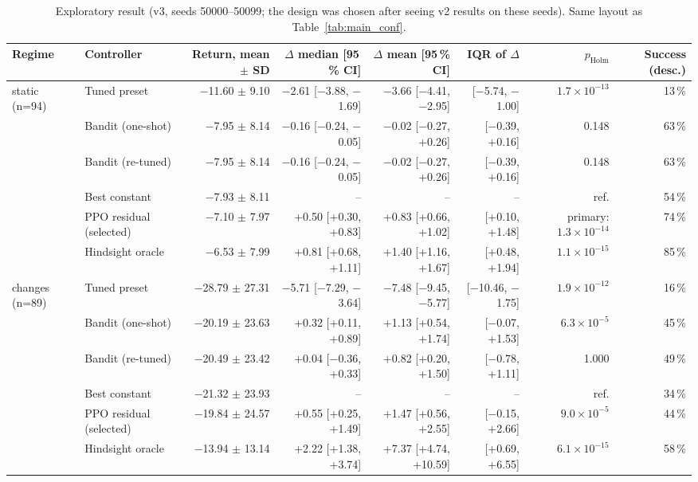 \begin{table}[t]
\centering
\small
\caption{Exploratory result (v3, seeds 50000--50099; the design was chosen after seeing v2 results on these seeds). Same layout as Table~\ref{tab:main_conf}.}
\label{tab:main_expl}
\begin{tabular}{llrrrrrr}
\toprule
Regime & Controller & Return, mean $\pm$ SD & $\Delta$ median [95\,\% CI] & $\Delta$ mean [95\,\% CI] & IQR of $\Delta$ & $p_{\mathrm{Holm}}$ & Success (desc.)\\
\midrule
static (n=94) & Tuned preset & $-$11.60 $\pm$ 9.10 & $-$2.61 [$-$3.88, $-$1.69] & $-$3.66 [$-$4.41, $-$2.95] & [$-$5.74, $-$1.00] & $1.7{\times}10^{-13}$ & 13\,\%\\
 & Bandit (one-shot) & $-$7.95 $\pm$ 8.14 & $-$0.16 [$-$0.24, $-$0.05] & $-$0.02 [$-$0.27, +0.26] & [$-$0.39, +0.16] & 0.148 & 63\,\%\\
 & Bandit (re-tuned) & $-$7.95 $\pm$ 8.14 & $-$0.16 [$-$0.24, $-$0.05] & $-$0.02 [$-$0.27, +0.26] & [$-$0.39, +0.16] & 0.148 & 63\,\%\\
 & Best constant & $-$7.93 $\pm$ 8.11 & -- & -- & -- & ref. & 54\,\%\\
 & PPO residual (selected) & $-$7.10 $\pm$ 7.97 & +0.50 [+0.30, +0.83] & +0.83 [+0.66, +1.02] & [+0.10, +1.48] & primary: $1.3{\times}10^{-14}$ & 74\,\%\\
 & Hindsight oracle & $-$6.53 $\pm$ 7.99 & +0.81 [+0.68, +1.11] & +1.40 [+1.16, +1.67] & [+0.48, +1.94] & $1.1{\times}10^{-15}$ & 85\,\%\\
\midrule
changes (n=89) & Tuned preset & $-$28.79 $\pm$ 27.31 & $-$5.71 [$-$7.29, $-$3.64] & $-$7.48 [$-$9.45, $-$5.77] & [$-$10.46, $-$1.75] & $1.9{\times}10^{-12}$ & 16\,\%\\
 & Bandit (one-shot) & $-$20.19 $\pm$ 23.63 & +0.32 [+0.11, +0.89] & +1.13 [+0.54, +1.74] & [$-$0.07, +1.53] & $6.3{\times}10^{-5}$ & 45\,\%\\
 & Bandit (re-tuned) & $-$20.49 $\pm$ 23.42 & +0.04 [$-$0.36, +0.33] & +0.82 [+0.20, +1.50] & [$-$0.78, +1.11] & 1.000 & 49\,\%\\
 & Best constant & $-$21.32 $\pm$ 23.93 & -- & -- & -- & ref. & 34\,\%\\
 & PPO residual (selected) & $-$19.84 $\pm$ 24.57 & +0.55 [+0.25, +1.49] & +1.47 [+0.56, +2.55] & [$-$0.15, +2.66] & $9.0{\times}10^{-5}$ & 44\,\%\\
 & Hindsight oracle & $-$13.94 $\pm$ 13.14 & +2.22 [+1.38, +3.74] & +7.37 [+4.74, +10.59] & [+0.69, +6.55] & $6.1{\times}10^{-15}$ & 58\,\%\\

\end{tabular}
\end{table}
